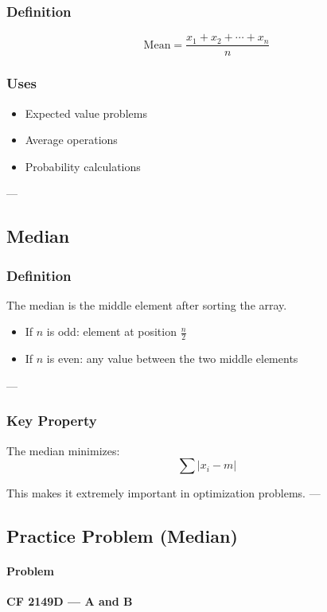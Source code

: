 \documentclass[11pt]{article}
\begin{document}
\subsubsection{Definition}
\[
\text{Mean} = \frac{x_1 + x_2 + \cdots + x_n}{n}
\]

\subsubsection{Uses}
\begin{itemize}
    \item Expected value problems
    \item Average operations
    \item Probability calculations
\end{itemize}

---

\subsection{Median}

\subsubsection{Definition}
The median is the middle element after sorting the array.

\begin{itemize}
    \item If $n$ is odd: element at position $\frac{n}{2}$
    \item If $n$ is even: any value between the two middle elements
\end{itemize}

---

\subsubsection{Key Property}
The median minimizes:
\[
\sum |x_i - m|
\]

This makes it extremely important in optimization problems.
---

\subsection{Practice Problem (Median)}

\paragraph{Problem}
\textbf{CF 2149D — A and B}
\end{document}
